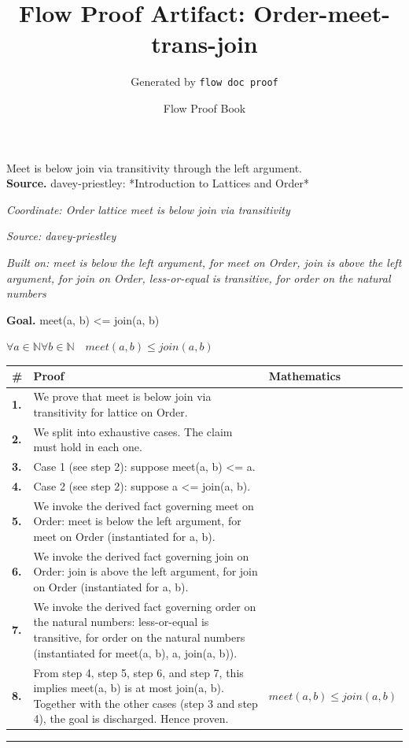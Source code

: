 \documentclass[11pt]{article}
\title{Flow Proof Artifact: Order-meet-trans-join}
\author{Generated by \texttt{flow doc proof}}
\date{Flow Proof Book}
\theoremstyle{definition}
\begin{document}
\maketitle
Meet is below join via transitivity through the left argument.\\[0.5em]
\textbf{Source.} davey-priestley: *Introduction to Lattices and Order*\\[0.5em]
\bigskip
{}\par
\smallskip\noindent\textit{Coordinate: Order \cdot lattice \cdot meet is below join via transitivity}\par
\smallskip\noindent\textit{Source: davey-priestley}\par
\smallskip\noindent\textit{Built on: meet is below the left argument, for meet on Order, join is above the left argument, for join on Order, less-or-equal is transitive, for order on the natural numbers}\par
\medskip
\noindent\textbf{Goal.} meet(a, b) <= join(a, b)\par
\noindent$\displaystyle \forall a \in \mathbb{N} \forall b \in \mathbb{N}\quad meet(a, b) \le join(a, b)$\par
\medskip
\noindent
\begin{tabular}{@{} >{\raggedright\arraybackslash}p{} >{\raggedright\arraybackslash}p{} >{\raggedleft\arraybackslash}p{} @{}}
\textbf{\#} & \textbf{Proof} & \textbf{Mathematics} \\
\midrule
\textbf{1.} & We prove that meet is below join via transitivity for lattice on Order. & \\[0.45em]
\textbf{2.} & We split into exhaustive cases. The claim must hold in each one. & \\[0.45em]
\textbf{3.} & Case 1 (see step 2): suppose meet(a, b) <= a. & \\[0.45em]
\textbf{4.} & Case 2 (see step 2): suppose a <= join(a, b). & \\[0.45em]
\textbf{5.} & We invoke the derived fact governing meet on Order: meet is below the left argument, for meet on Order (instantiated for a, b). & \\[0.45em]
\textbf{6.} & We invoke the derived fact governing join on Order: join is above the left argument, for join on Order (instantiated for a, b). & \\[0.45em]
\textbf{7.} & We invoke the derived fact governing order on the natural numbers: less-or-equal is transitive, for order on the natural numbers (instantiated for meet(a, b), a, join(a, b)). & \\[0.45em]
\textbf{8.} & From step 4, step 5, step 6, and step 7, this implies meet(a, b) is at most join(a, b). Together with the other cases (step 3 and step 4), the goal is discharged. Hence proven. & $\displaystyle meet(a, b) \le join(a, b)$ \\[0.45em]
\bottomrule
\end{tabular}
\label{thm:Order-lattice-meet_is_below_join_via_transitivity}
\par\medskip\hrule
\end{document}
